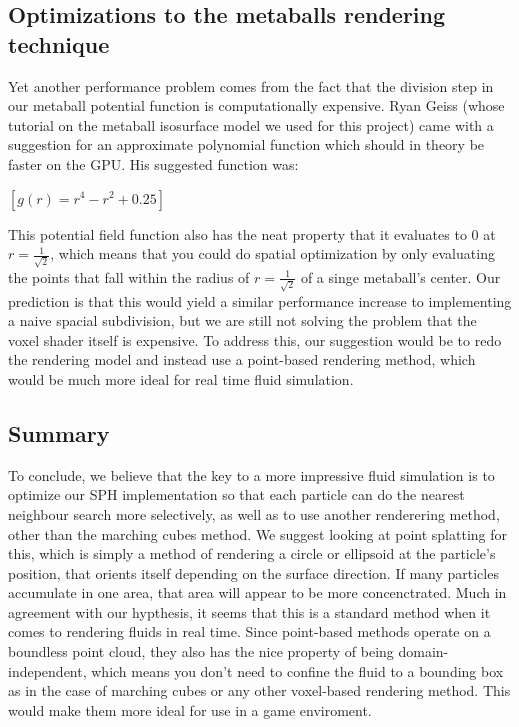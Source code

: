 \documentclass{article}
\begin{document}
\begin{multicols}{2}
        \subsection{Optimizations to the metaballs rendering technique}
        Yet another performance problem comes from the fact that the division step in our metaball potential function is computationally expensive.
        Ryan Geiss (whose tutorial on the metaball isosurface model we used for this project) came with a suggestion for an approximate polynomial function which should in theory be faster on the GPU. His suggested function was:

        \begin{center}
        $[g(r) = r^4 - r^2 + 0.25]$
        \end{center}

        This potential field function also has the neat property that it evaluates to 0 at $r=\frac{1}{\sqrt{2}}$, which means that you could do spatial optimization by only evaluating the points that fall within the radius of $r=\frac{1}{\sqrt{2}}$ of a singe metaball's center.
        \cite{geiss00}
        Our prediction is that this would yield a similar performance increase to implementing a naive spacial subdivision, but we are still not solving the problem that the voxel shader itself is expensive.
        To address this, our suggestion would be to redo the rendering model and instead use a point-based rendering method, which would be much more ideal for real time fluid simulation.

        \subsection{Summary}
        To conclude, we believe that the key to a more impressive fluid simulation is to optimize our SPH implementation so that each particle can do the nearest neighbour search more selectively, as well as to use another renderering method, other than the marching cubes method.
        We suggest looking at point splatting for this, which is simply a method of rendering a circle or ellipsoid at the particle's position, that orients itself depending on the surface direction.
        If many particles accumulate in one area, that area will appear to be more concenctrated.
        Much in agreement with our hypthesis, it seems that this is a standard method when it comes to rendering fluids in real time.
        Since point-based methods operate on a boundless point cloud, they also has the nice property of being domain-independent, which means you don't need to confine the fluid to a bounding box as in the case of marching cubes or any other voxel-based rendering method. This would make them more ideal for use in a game enviroment.


\end{multicols}
\end{document}
